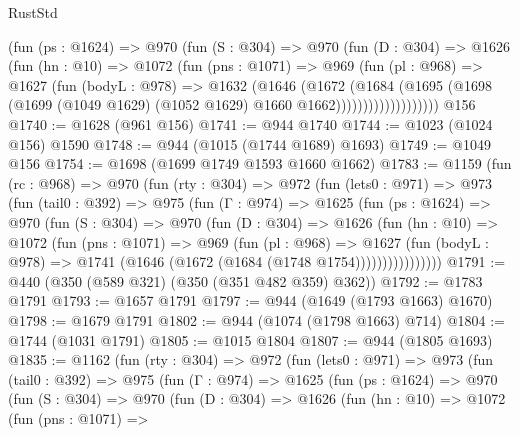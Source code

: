 \begin{lexlean}{RustStd}
\begin{coremodule}
{\begin{coremodule}
{{{{{{{{{{                (fun (ps : @1624) =>
                @970
                  (fun (S : @304) =>
                  @970
                    (fun (D : @304) =>
                    @1626
                      (fun (hn : @10) =>
                      @1072
                        (fun (pns : @1071) =>
                        @969
                          (fun (pl : @968) =>
                          @1627
                            (fun (bodyL : @978) =>
                            @1632
                              (@1646
                                (@1672
                                  (@1684
                                    (@1695
                                      (@1698
                                        (@1699
                                          (@1049 @1629)
                                          (@1052 @1629)
                                          @1660
                                          @1662)))))))))))))))))))
    @156
@1740 := @1628 (@961 @156)
@1741 := @944 @1740
@1744 := @1023 (@1024 @156) @1590
@1748 := @944 (@1015 (@1744 @1689) @1693)
@1749 := @1049 @156
@1754 := @1698 (@1699 @1749 @1593 @1660 @1662)
@1783 := @1159
    (fun (rc : @968) =>
    @970
      (fun (rty : @304) =>
      @972
        (fun (lets0 : @971) =>
        @973
          (fun (tail0 : @392) =>
          @975
            (fun (Γ : @974) =>
            @1625
              (fun (ps : @1624) =>
              @970
                (fun (S : @304) =>
                @970
                  (fun (D : @304) =>
                  @1626
                    (fun (hn : @10) =>
                    @1072
                      (fun (pns : @1071) =>
                      @969
                        (fun (pl : @968) =>
                        @1627
                          (fun (bodyL : @978) =>
                          @1741 (@1646 (@1672 (@1684 (@1748 @1754))))))))))))))))
@1791 := @440 (@350 (@589 @321) (@350 (@351 @482 @359) @362))
@1792 := @1783 @1791
@1793 := @1657 @1791
@1797 := @944 (@1649 (@1793 @1663) @1670)
@1798 := @1679 @1791
@1802 := @944 (@1074 (@1798 @1663) @714)
@1804 := @1744 (@1031 @1791)
@1805 := @1015 @1804
@1807 := @944 (@1805 @1693)
@1835 := @1162
    (fun (rty : @304) =>
    @972
      (fun (lets0 : @971) =>
      @973
        (fun (tail0 : @392) =>
        @975
          (fun (Γ : @974) =>
          @1625
            (fun (ps : @1624) =>
            @970
              (fun (S : @304) =>
              @970
                (fun (D : @304) =>
                @1626
                  (fun (hn : @10) =>
                  @1072
                    (fun (pns : @1071) =>
}}}}}}}}}}
\end{coremodule}}
\end{coremodule}
\end{lexlean}
